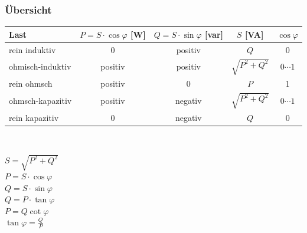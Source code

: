 		\subsubsection{Übersicht}
			\begin{centering}
			\begin{tabular}{|l|c|c|c|c|}
				\hline
					Last & $P=S\cdot\cos\varphi$  [W] & $Q=S\cdot\sin\varphi$  [var] & $S$ 
					[VA] & $\cos\varphi$
					\\
				\hline
					rein induktiv & 0 & positiv & $Q$ & 0\\
				\hline
					ohmisch-induktiv & positiv & positiv & $\sqrt{P^2+Q^2}$& $0\cdots1$\\
				\hline
					rein ohmsch & positiv & 0 & $P$ & 1 \\
				\hline
					ohmsch-kapazitiv & positiv & negativ & $\sqrt{P^2+Q^2}$& $0\cdots1$\\
				\hline
					rein kapazitiv & 0 & negativ & $Q$ & 0 \\
				\hline
			\end{tabular}\\
				\end{centering}
		\begin{multicols}{2}
				$S=\sqrt{P^2+Q^2}$\\
				$P=S\cdot \cos \varphi$\\
				$Q=S\cdot\sin\varphi$\\
				$Q=P\cdot\tan\varphi$\\
				$P=Q\cot\varphi$\\
				$\tan\varphi=\frac{Q}{P}$	
		\end{multicols}
